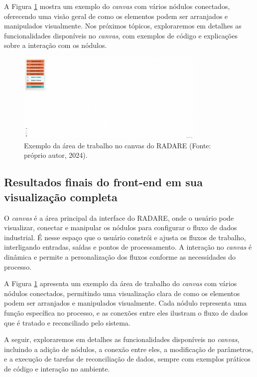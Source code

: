 A Figura \ref{Fig:CanvasArea} mostra um exemplo do \textit{canvas} com vários nódulos conectados, oferecendo uma visão geral de como os elementos podem ser arranjados e manipulados visualmente. Nos próximos tópicos, exploraremos em detalhes as funcionalidades disponíveis no \textit{canvas}, com exemplos de código e explicações sobre a interação com os nódulos.

\begin{figure}[htbp]
    \centering
    \includegraphics[width=0.8\textwidth]{figuras/empty-canvas.png}
    \caption{Exemplo da área de trabalho no canvas do RADARE (Fonte: próprio autor, 2024).}
    \label{Fig:CanvasArea}
\end{figure}

\subsection{Resultados finais do front-end em sua visualização completa}

O \textit{canvas} é a área principal da interface do RADARE, onde o usuário pode visualizar, conectar e manipular os nódulos para configurar o fluxo de dados industrial. É nesse espaço que o usuário constrói e ajusta os fluxos de trabalho, interligando entradas, saídas e pontos de processamento. A interação no \textit{canvas} é dinâmica e permite a personalização dos fluxos conforme as necessidades do processo.

A Figura \ref{Fig:CanvasArea} apresenta um exemplo da área de trabalho do \textit{canvas} com vários nódulos conectados, permitindo uma visualização clara de como os elementos podem ser arranjados e manipulados visualmente. Cada nódulo representa uma função específica no processo, e as conexões entre eles ilustram o fluxo de dados que é tratado e reconciliado pelo sistema.

A seguir, exploraremos em detalhes as funcionalidades disponíveis no \textit{canvas}, incluindo a adição de nódulos, a conexão entre eles, a modificação de parâmetros, e a execução de tarefas de reconciliação de dados, sempre com exemplos práticos de código e interação no ambiente.

